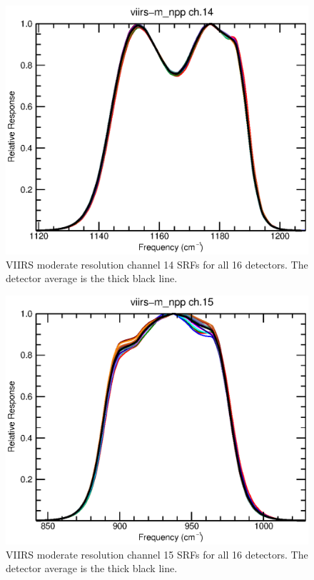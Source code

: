 \begin{figure}[H]
  \centering
  \includegraphics[bb= 0 15 400 330,clip,scale=0.8]{graphics/srfs/viirs-m_npp-14.eps}
  \caption{VIIRS moderate resolution channel 14 SRFs for all 16 detectors. The detector average is the thick black line.}
  \label{fig:viirs-m_npp-14}
\end{figure}
\begin{figure}[H]
  \centering
  \includegraphics[bb= 0 15 400 330,clip,scale=0.8]{graphics/srfs/viirs-m_npp-15.eps}
  \caption{VIIRS moderate resolution channel 15 SRFs for all 16 detectors. The detector average is the thick black line.}
  \label{fig:viirs-m_npp-15}
\end{figure}
